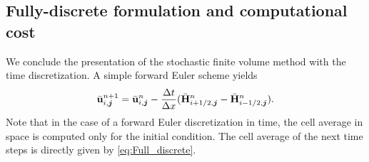 \documentclass{article}
\newcommand{\bfu}{ {\bf u} }
\newcommand{\ibfj}{ {\boldsymbol{j}  } }
\newcommand{\bfxi}{ {\bm \xi} }
\newcommand{\bff}{ {\bf f} }
\newcommand{\bfH}{ {\bf H} }
\newcommand{\diff}{ \; \text{d} }
\begin{document}







\subsection{Fully-discrete formulation and computational cost}
We conclude the presentation of the stochastic finite volume method with the time discretization. 
A simple forward Euler scheme yields
\begin{equation} \label{eq:Full_discrete}
    \bar \bfu_{i,\ibfj}^{n +1} 
    = \bar \bfu_{i,\ibfj}^n  
    - \frac{\Delta t}{\Delta x} (\bar \bfH_{i+1/2,\ibfj}^n  - \bar \bfH_{i-1/2,\ibfj}^n ).
\end{equation}
Note that in the case of a forward Euler discretization in time, the cell average in space is computed only for the initial condition. 
The cell average of the next time steps is directly given by \eqref{eq:Full_discrete}.
\end{document}
